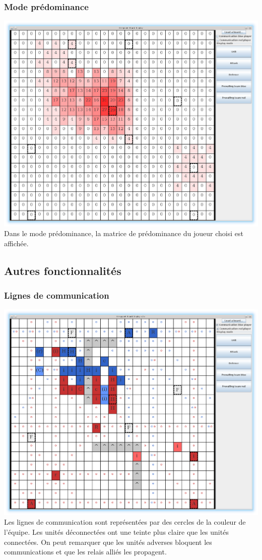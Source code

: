 \documentclass[12pt]{article}
\begin{document}
			\clearpage	

			\subsubsection{ Mode prédominance}
			\includegraphics[scale=0.4]{images/screen3.eps}
			Dans le mode prédominance, la matrice de prédominance du joueur choisi est affichée.

			\clearpage

		\subsection{ Autres fonctionnalités }

			\subsubsection{ Lignes de communication }
			\includegraphics[scale=0.4]{images/screen4.eps}
			Les lignes de communication sont représentées par des cercles de la couleur de l'équipe.
			Les unités déconnectées ont une teinte plus claire que les unités connectées.
			On peut remarquer que les unités adverses bloquent les communications et que les relais alliés les propagent.
			\clearpage
		
\end{document}
